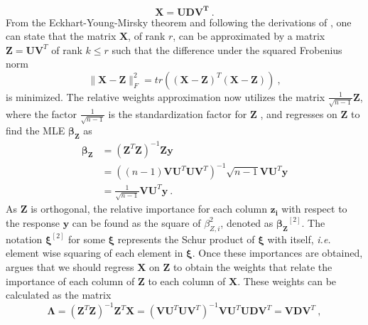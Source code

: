 \begin{equation}
    \label{eq:SVD}
    \mathbf{X} = \mathbf{UDV^T} \ .
\end{equation}
From the Eckhart-Young-Mirsky theorem \citep{mirsky-theorem} and following the derivations of \citet{johnson_minimization_trace}, one can state that the matrix $\mathbf{X}$, of rank $r$, can be approximated by a matrix $\mathbf{Z} = \mathbf{U}\mathbf{V}^T$ of rank $k\leq r$ such that the difference under the squared Frobenius norm
\begin{equation}
    \lVert \mathbf{X} - \mathbf{Z} \rVert_F^2 = tr \left( (\mathbf{X} - \mathbf{Z})^T(\mathbf{X} - \mathbf{Z}) \right) \ ,
\end{equation}
is minimized. The relative weights approximation now utilizes the matrix \citep{johnson_relative_weights} $\frac{1}{\sqrt{n-1}}\mathbf{{Z}}$, where the factor $\frac{1}{\sqrt{n-1}}$ is the standardization factor for $\mathbf{Z}$ \citep{matre}, and regresses on $\mathbf{Z}$ to find the MLE $\boldsymbol{\beta_Z}$ as
\begin{equation}
    \begin{aligned}
        \boldsymbol{\beta_Z} & = (\mathbf{Z}^T\mathbf{Z})^{-1}\mathbf{Z}\mathbf{y} \\
        & = \left((n-1) \mathbf{VU}^T\mathbf{UV}^T \right)^{-1} \sqrt{n-1}\mathbf{VU}^T\mathbf{y} \\
        & = \frac{1}{\sqrt{n-1}}\mathbf{V}\mathbf{U}^T\mathbf{y} \ .
    \end{aligned}
\end{equation} 
As $\mathbf{Z}$ is orthogonal, the relative importance for each column $\mathbf{z_i}$ with respect to the response $\mathbf{y}$ can be found as the square of $\beta_{Z, i}^2$, denoted as $\boldsymbol{\beta_Z}^{[2]}$. 
The notation $\boldsymbol{\xi}^{[2]}$ for some $\boldsymbol{\xi}$ represents the Schur product of $\boldsymbol{\xi}$ with itself, \textit{i.e.} element wise squaring of each element in $\boldsymbol{\xi}$.
Once these importances are obtained, \citet{johnson_relative_weights} argues that we should regress $\mathbf{X}$ on $\mathbf{Z}$ to obtain the weights that relate the importance of each column of $\mathbf{Z}$ to each column of $\mathbf{X}$. These weights can be calculated as the matrix
\begin{equation}
    \label{eq:lambda}
    \boldsymbol{\Lambda} = (\mathbf{Z}^T\mathbf{Z})^{-1}\mathbf{Z}^T\mathbf{X} = (\mathbf{V}\mathbf{U}^T\mathbf{U}\mathbf{V}^T)^{-1}\mathbf{V}\mathbf{U}^T\mathbf{U}\mathbf{D}\mathbf{V}^T = \mathbf{V}\mathbf{D}\mathbf{V}^T \ ,
\end{equation}
